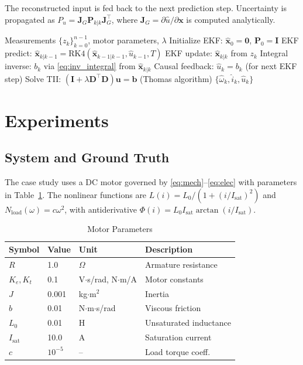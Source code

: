 \documentclass[lettersize,journal]{IEEEtran}
\begin{document}
The reconstructed input is fed back to the next prediction step. Uncertainty is propagated as $P_u = \mathbf{J}_G \mathbf{P}_{k|k} \mathbf{J}_G^\top$, where $\mathbf{J}_G = \partial\hat{u}/\partial\mathbf{x}$ is computed analytically.

\begin{algorithm}[!t]
\caption{TII Pipeline}
\label{alg:tii}
\begin{algorithmic}[1]
\REQUIRE Measurements $\{z_k\}_{k=0}^{n-1}$, motor parameters, $\lambda$
\STATE Initialize EKF: $\hat{\mathbf{x}}_0 = \mathbf{0}$, $\mathbf{P}_0 = \mathbf{I}$
    \STATE EKF predict: $\hat{\mathbf{x}}_{k|k-1} = \text{RK4}(\hat{\mathbf{x}}_{k-1|k-1}, \hat{u}_{k-1}, T)$
    \STATE EKF update: $\hat{\mathbf{x}}_{k|k}$ from $z_k$
    \STATE Integral inverse: $b_k$ via \eqref{eq:inv_integral} from $\hat{\mathbf{x}}_{k|k}$
    \STATE Causal feedback: $\hat{u}_k = b_k$ (for next EKF step)
\ENDFOR
\STATE Solve TII: $(\mathbf{I} + \lambda\mathbf{D}^\top\mathbf{D})\mathbf{u} = \mathbf{b}$ (Thomas algorithm)
\RETURN $\{\hat{\omega}_k, \hat{i}_k, \hat{u}_k\}$
\end{algorithmic}
\end{algorithm}

\section{Experiments}
\label{sec:experiments}

\subsection{System and Ground Truth}

The case study uses a DC motor governed by \eqref{eq:mech}--\eqref{eq:elec} with parameters in Table~\ref{tab:params}. The nonlinear functions are $L(i) = L_0/(1 + (i/I_{\text{sat}})^2)$ and $N_{\text{load}}(\omega) = c\omega^2$, with antiderivative $\Phi(i) = L_0 I_{\text{sat}} \arctan(i/I_{\text{sat}})$.

\begin{table}[!t]
\centering
\caption{Motor Parameters}
\label{tab:params}
\begin{tabular}{llll}
\toprule
Symbol & Value & Unit & Description \\
\midrule
$R$ & 1.0 & $\Omega$ & Armature resistance \\
$K_e, K_t$ & 0.1 & V$\cdot$s/rad, N$\cdot$m/A & Motor constants \\
$J$ & 0.001 & kg$\cdot$m$^2$ & Inertia \\
$b$ & 0.01 & N$\cdot$m$\cdot$s/rad & Viscous friction \\
$L_0$ & 0.01 & H & Unsaturated inductance \\
$I_{\text{sat}}$ & 10.0 & A & Saturation current \\
$c$ & $10^{-5}$ & -- & Load torque coeff. \\
\bottomrule
\end{tabular}
\end{table}
\end{document}
